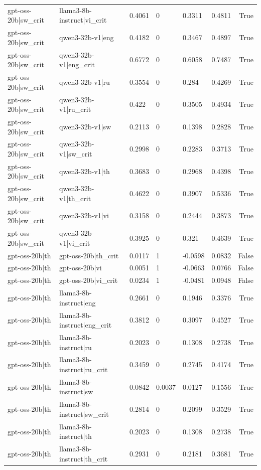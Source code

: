 \begin{table}
\begin{tabular}{llllllr}
gpt-oss-20b|sw_crit & llama3-8b-instruct|vi_crit & 0.4061 & 0 & 0.3311 & 0.4811 & True \\
gpt-oss-20b|sw_crit & qwen3-32b-v1|eng & 0.4182 & 0 & 0.3467 & 0.4897 & True \\
gpt-oss-20b|sw_crit & qwen3-32b-v1|eng_crit & 0.6772 & 0 & 0.6058 & 0.7487 & True \\
gpt-oss-20b|sw_crit & qwen3-32b-v1|ru & 0.3554 & 0 & 0.284 & 0.4269 & True \\
gpt-oss-20b|sw_crit & qwen3-32b-v1|ru_crit & 0.422 & 0 & 0.3505 & 0.4934 & True \\
gpt-oss-20b|sw_crit & qwen3-32b-v1|sw & 0.2113 & 0 & 0.1398 & 0.2828 & True \\
gpt-oss-20b|sw_crit & qwen3-32b-v1|sw_crit & 0.2998 & 0 & 0.2283 & 0.3713 & True \\
gpt-oss-20b|sw_crit & qwen3-32b-v1|th & 0.3683 & 0 & 0.2968 & 0.4398 & True \\
gpt-oss-20b|sw_crit & qwen3-32b-v1|th_crit & 0.4622 & 0 & 0.3907 & 0.5336 & True \\
gpt-oss-20b|sw_crit & qwen3-32b-v1|vi & 0.3158 & 0 & 0.2444 & 0.3873 & True \\
gpt-oss-20b|sw_crit & qwen3-32b-v1|vi_crit & 0.3925 & 0 & 0.321 & 0.4639 & True \\
gpt-oss-20b|th & gpt-oss-20b|th_crit & 0.0117 & 1 & -0.0598 & 0.0832 & False \\
gpt-oss-20b|th & gpt-oss-20b|vi & 0.0051 & 1 & -0.0663 & 0.0766 & False \\
gpt-oss-20b|th & gpt-oss-20b|vi_crit & 0.0234 & 1 & -0.0481 & 0.0948 & False \\
gpt-oss-20b|th & llama3-8b-instruct|eng & 0.2661 & 0 & 0.1946 & 0.3376 & True \\
gpt-oss-20b|th & llama3-8b-instruct|eng_crit & 0.3812 & 0 & 0.3097 & 0.4527 & True \\
gpt-oss-20b|th & llama3-8b-instruct|ru & 0.2023 & 0 & 0.1308 & 0.2738 & True \\
gpt-oss-20b|th & llama3-8b-instruct|ru_crit & 0.3459 & 0 & 0.2745 & 0.4174 & True \\
gpt-oss-20b|th & llama3-8b-instruct|sw & 0.0842 & 0.0037 & 0.0127 & 0.1556 & True \\
gpt-oss-20b|th & llama3-8b-instruct|sw_crit & 0.2814 & 0 & 0.2099 & 0.3529 & True \\
gpt-oss-20b|th & llama3-8b-instruct|th & 0.2023 & 0 & 0.1308 & 0.2738 & True \\
gpt-oss-20b|th & llama3-8b-instruct|th_crit & 0.2931 & 0 & 0.2181 & 0.3681 & True \\

\end{tabular}
\end{table}
